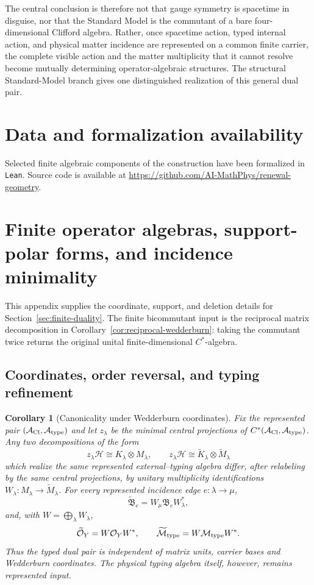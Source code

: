 \documentclass[11pt]{article}
\numberwithin{equation}{section}
\newtheorem{corollary}[theorem]{Corollary}
\theoremstyle{definition}
\theoremstyle{remark}
\newcommand{\A}{\mathcal A}
\newcommand{\Hh}{\mathcal H}
\newcommand{\M}{\mathcal M}
\newcommand{\Oalg}{\mathcal O}
\begin{document}
The central conclusion is therefore not that gauge symmetry is spacetime in
disguise, nor that the Standard Model is the commutant of a bare
four-dimensional Clifford algebra.  Rather, once spacetime action, typed
internal action, and physical matter incidence are represented on a common
finite carrier, the complete visible action and the matter multiplicity that
it cannot resolve become mutually determining operator-algebraic structures.
The structural Standard-Model branch gives one distinguished realization of
this general dual pair.

\section*{Data and formalization availability}
Selected finite algebraic components of the construction have been formalized in
\texttt{Lean}.  Source code is available at
\url{https://github.com/AI-MathPhys/renewal-geometry}.


\appendix


\section{Finite operator algebras, support-polar forms, and incidence minimality}
\label{app:commutant}

This appendix supplies the coordinate, support, and deletion details for
Section~\ref{sec:finite-duality}.  The finite bicommutant input is the
reciprocal matrix decomposition in Corollary~\ref{cor:reciprocal-wedderburn}:
taking the commutant twice returns the original unital finite-dimensional
$C^*$-algebra.


\subsection{Coordinates, order reversal, and typing refinement}
\label{app:coefficient-consequences}

\begin{corollary}[Canonicality under Wedderburn coordinates]
\label{cor:typing-coordinate-canonicality}
Fix the represented pair $(\A_{\rm Cl},\A_{\rm type})$ and let
$z_\lambda$ be the minimal central projections of
$C^*(\A_{\rm Cl},\A_{\rm type})$.  Any two decompositions of the form
\[
 z_\lambda\Hh\cong K_\lambda\otimes M_\lambda,
 \qquad
 z_\lambda\Hh\cong\widetilde K_\lambda\otimes\widetilde M_\lambda
\]
which realize the same represented external--typing algebra differ, after
relabeling by the same central projections, by unitary multiplicity
identifications $W_\lambda:M_\lambda\to\widetilde M_\lambda$.  For every
represented incidence edge $e:\lambda\to\mu$,
\[
 \widetilde{\mathfrak B}_e
 =W_\mu\mathfrak B_eW_\lambda^*,
\]
and, with $W=\bigoplus_\lambda W_\lambda$,
\begin{equation}
 \widetilde{\Oalg}_Y=W\Oalg_YW^*,
 \qquad
 \widetilde{\M}_{\rm type}=W\M_{\rm type}W^*.
 \label{eq:typing-coordinate-canonicality}
\end{equation}
Thus the typed dual pair is independent of matrix units, carrier bases and
Wedderburn coordinates.  The physical typing algebra itself, however, remains
represented input.
\end{corollary}
\end{document}
